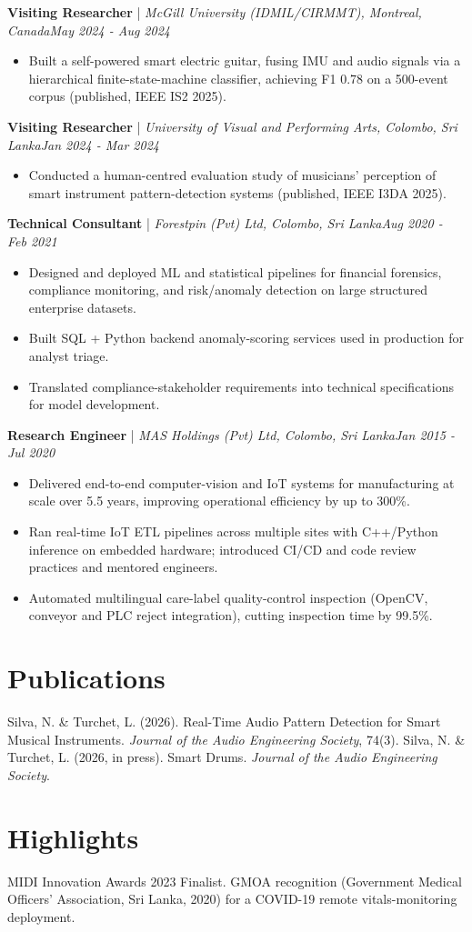 \documentclass[11pt]{article}
\newenvironment{cvrole}[5]{%
  \par\noindent\textbf{\large #1} | \textit{\small #2, #3}\hfill \textit{\small #4 - #5}\par
  \begin{itemize}[leftmargin=2em, itemsep=-0.3em, topsep=-0.5em]%
}{%
  \end{itemize}\par\noindent\mbox{}\par\vspace{0.1em}%
}
\begin{document}
\begin{cvrole}{Visiting Researcher}{McGill University (IDMIL/CIRMMT)}{Montreal, Canada}{May 2024}{Aug 2024}
\item Built a self-powered smart electric guitar, fusing IMU and audio signals via a hierarchical finite-state-machine classifier, achieving F1 0.78 on a 500-event corpus (published, IEEE IS2 2025).
\end{cvrole}

\begin{cvrole}{Visiting Researcher}{University of Visual and Performing Arts}{Colombo, Sri Lanka}{Jan 2024}{Mar 2024}
\item Conducted a human-centred evaluation study of musicians' perception of smart instrument pattern-detection systems (published, IEEE I3DA 2025).
\end{cvrole}

\begin{cvrole}{Technical Consultant}{Forestpin (Pvt) Ltd}{Colombo, Sri Lanka}{Aug 2020}{Feb 2021}
\item Designed and deployed ML and statistical pipelines for financial forensics, compliance monitoring, and risk/anomaly detection on large structured enterprise datasets.
\item Built SQL + Python backend anomaly-scoring services used in production for analyst triage.
\item Translated compliance-stakeholder requirements into technical specifications for model development.
\end{cvrole}

\begin{cvrole}{Research Engineer}{MAS Holdings (Pvt) Ltd}{Colombo, Sri Lanka}{Jan 2015}{Jul 2020}
\item Delivered end-to-end computer-vision and IoT systems for manufacturing at scale over 5.5 years, improving operational efficiency by up to 300\%.
\item Ran real-time IoT ETL pipelines across multiple sites with C++/Python inference on embedded hardware; introduced CI/CD and code review practices and mentored engineers.
\item Automated multilingual care-label quality-control inspection (OpenCV, conveyor and PLC reject integration), cutting inspection time by 99.5\%.
\end{cvrole}

\section*{Publications}
Silva, N. \& Turchet, L. (2026). Real-Time Audio Pattern Detection for Smart Musical Instruments. \textit{Journal of the Audio Engineering Society}, 74(3). Silva, N. \& Turchet, L. (2026, in press). Smart Drums. \textit{Journal of the Audio Engineering Society}.

\section*{Highlights}
MIDI Innovation Awards 2023 Finalist. GMOA recognition (Government Medical Officers' Association, Sri Lanka, 2020) for a COVID-19 remote vitals-monitoring deployment.
\end{document}
